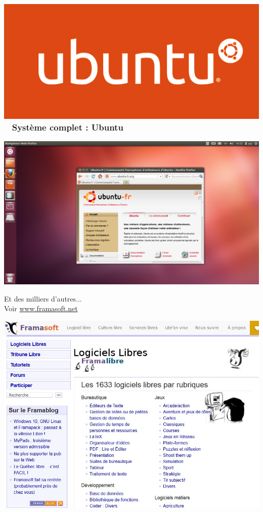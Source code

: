 \documentclass{beamer}
\begin{document}
\begin{frame}
\frametitle{\includegraphics[scale=0.1] {./images/ubuntu.png} ~ Système complet : Ubuntu}
\begin{center}
\includegraphics[scale=0.3] {./images/ubuntu_bureau.jpg} 
\end{center}
\end{frame}

\begin{frame}
\begin{center}
\Huge{Et des milliers d'autres...
\\Voir \url{www.framasoft.net}}
\begin{center}
\includegraphics[scale=0.4] {./images/framasoft.jpg}
\end{center} 
\end{center}
\end{frame}
\end{document}
